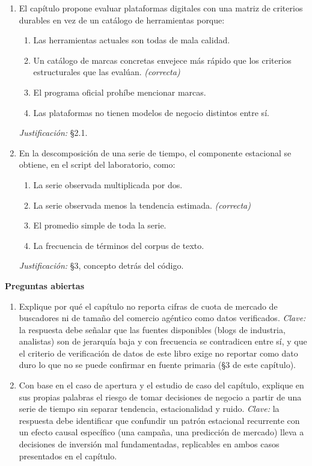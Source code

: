 \begin{enumerate}
  \item El capítulo propone evaluar plataformas digitales con una matriz de
  criterios durables en vez de un catálogo de herramientas porque:
  \begin{enumerate}
    \item[a)] Las herramientas actuales son todas de mala calidad.
    \item[b)] Un catálogo de marcas concretas envejece más rápido que los criterios estructurales que las evalúan. \textit{(correcta)}
    \item[c)] El programa oficial prohíbe mencionar marcas.
    \item[d)] Las plataformas no tienen modelos de negocio distintos entre sí.
  \end{enumerate}
  \textit{Justificación:} §2.1.

  \item En la descomposición de una serie de tiempo, el componente
  estacional se obtiene, en el script del laboratorio, como:
  \begin{enumerate}
    \item[a)] La serie observada multiplicada por dos.
    \item[b)] La serie observada menos la tendencia estimada. \textit{(correcta)}
    \item[c)] El promedio simple de toda la serie.
    \item[d)] La frecuencia de términos del corpus de texto.
  \end{enumerate}
  \textit{Justificación:} §3, concepto detrás del código.
\end{enumerate}

\textbf{Preguntas abiertas}

\begin{enumerate}
  \item Explique por qué el capítulo no reporta cifras de cuota de mercado
  de buscadores ni de tamaño del comercio agéntico como datos verificados.
  \textit{Clave:} la respuesta debe señalar que las fuentes disponibles
  (blogs de industria, analistas) son de jerarquía baja y con frecuencia se
  contradicen entre sí, y que el criterio de verificación de datos de este
  libro exige no reportar como dato duro lo que no se puede confirmar en
  fuente primaria (§3 de este capítulo).
  \item Con base en el caso de apertura y el estudio de caso del capítulo,
  explique en sus propias palabras el riesgo de tomar decisiones de negocio
  a partir de una serie de tiempo sin separar tendencia, estacionalidad y
  ruido. \textit{Clave:} la respuesta debe identificar que confundir un
  patrón estacional recurrente con un efecto causal específico (una campaña,
  una predicción de mercado) lleva a decisiones de inversión mal
  fundamentadas, replicables en ambos casos presentados en el capítulo.
\end{enumerate}

